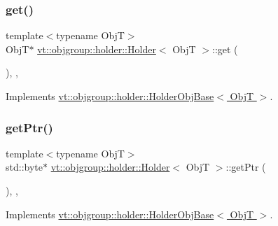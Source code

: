 \subsubsection{\texorpdfstring{get()}{get()}}
{\footnotesize\ttfamily template$<$typename ObjT$>$ \\
ObjT$\ast$ \hyperlink{structvt_1_1objgroup_1_1holder_1_1_holder}{vt\+::objgroup\+::holder\+::\+Holder}$<$ ObjT $>$\+::get (\begin{DoxyParamCaption}{ }\end{DoxyParamCaption})\hspace{0.3cm}{\ttfamily [inline]}, {\ttfamily [override]}, {\ttfamily [virtual]}}



Implements \hyperlink{structvt_1_1objgroup_1_1holder_1_1_holder_obj_base_a4b350b0126259d31a62fd426a08f6698}{vt\+::objgroup\+::holder\+::\+Holder\+Obj\+Base$<$ Obj\+T $>$}.

\mbox{\label{structvt_1_1objgroup_1_1holder_1_1_holder_a421058daef664fb76d90439aef1aaea5}} 
\subsubsection{\texorpdfstring{get\+Ptr()}{getPtr()}}
{\footnotesize\ttfamily template$<$typename ObjT$>$ \\
std\+::byte$\ast$ \hyperlink{structvt_1_1objgroup_1_1holder_1_1_holder}{vt\+::objgroup\+::holder\+::\+Holder}$<$ ObjT $>$\+::get\+Ptr (\begin{DoxyParamCaption}{ }\end{DoxyParamCaption})\hspace{0.3cm}{\ttfamily [inline]}, {\ttfamily [override]}, {\ttfamily [virtual]}}



Implements \hyperlink{structvt_1_1objgroup_1_1holder_1_1_holder_obj_base_adbb4d702b76306f185e29388961e1e2d}{vt\+::objgroup\+::holder\+::\+Holder\+Obj\+Base$<$ Obj\+T $>$}.

\mbox{\label{structvt_1_1objgroup_1_1holder_1_1_holder_a4ce99c48b611a65189a6891c780b6500}} 
